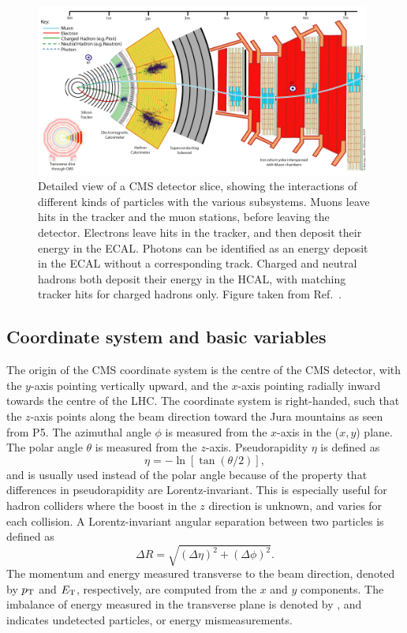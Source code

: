 \begin{figure}[htpb]
  \centering
  \includegraphics[width=0.98\textwidth]{figures/cms/CMS_Slice}
  \caption{Detailed view of a CMS detector slice, showing the interactions of different kinds of
particles with the various subsystems. Muons leave hits in the tracker and the muon stations,
before leaving the detector. Electrons leave hits in the tracker, and then deposit their
energy in the ECAL. Photons can be identified as an energy deposit in the ECAL without a
corresponding track. Charged and neutral hadrons both deposit their energy in the HCAL, with
matching tracker hits for charged hadrons only. 
Figure taken from Ref.~\cite{CMS_slice}.
  \label{fig:cms_slice}}
\end{figure}

\subsection{Coordinate system and basic variables \label{sec:cms_coordinates}}

The origin of the CMS coordinate system is the centre of the CMS detector, with the $y$-axis
pointing vertically upward, and the $x$-axis pointing radially inward towards the centre of the
LHC. The coordinate system is right-handed, such that the $z$-axis points along the beam direction
toward the Jura mountains as seen from P5. 
The azimuthal angle $\phi$ is measured from the $x$-axis in the ($x,y$) plane. The polar angle
$\theta$ is measured from the $z$-axis. 
Pseudorapidity $\eta$ is defined as 
\begin{equation}
 \eta = - \ln \left[ \tan(\theta/2) \right],  
\end{equation}
and is usually used instead of the
polar angle because of the property that differences in pseudorapidity are
Lorentz-invariant. This is especially useful for hadron colliders where the boost in the $z$
direction is unknown, and varies for each collision. A Lorentz-invariant angular separation between
two particles is defined as 
\begin{equation}
\Delta R = \sqrt{(\Delta\eta)^2 + (\Delta\phi)^2}.
\end{equation}
The momentum and energy measured transverse to the beam direction, denoted by $p_{\mathrm{T}}$ and $E_{\mathrm{T}}$,
respectively, are computed from the $x$ and $y$ components.
The imbalance of energy measured in the transverse plane is denoted by \ETm, and indicates
undetected particles, or energy mismeasurements.
 

